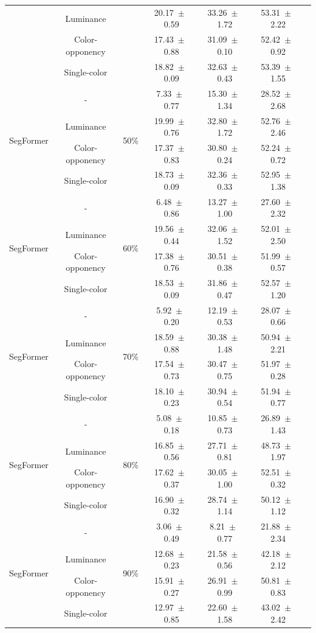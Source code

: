 \begin{table}[h]
\begin{tabular}{@{}lccc ccc@{}}
& Luminance & & 20.17~$\pm$~0.59 & 33.26~$\pm$~1.72 & 53.31~$\pm$~2.22 \\
& Color-opponency & & 17.43~$\pm$~0.88 & 31.09~$\pm$~0.10 & 52.42~$\pm$~0.92 \\
& Single-color & & 18.82~$\pm$~0.09 & 32.63~$\pm$~0.43 & 53.39~$\pm$~1.55 \\
\midrule
\multirow{4}{*}{SegFormer} & - & \multirow{4}{*}{50\%} & 7.33~$\pm$~0.77 & 15.30~$\pm$~1.34 & 28.52~$\pm$~2.68 \\
& Luminance & & 19.99~$\pm$~0.76 & 32.80~$\pm$~1.72 & 52.76~$\pm$~2.46 \\
& Color-opponency & & 17.37~$\pm$~0.83 & 30.80~$\pm$~0.24 & 52.24~$\pm$~0.72 \\
& Single-color & & 18.73~$\pm$~0.09 & 32.36~$\pm$~0.33 & 52.95~$\pm$~1.38 \\
\midrule
\multirow{4}{*}{SegFormer} & - & \multirow{4}{*}{60\%} & 6.48~$\pm$~0.86 & 13.27~$\pm$~1.00 & 27.60~$\pm$~2.32 \\
& Luminance & & 19.56~$\pm$~0.44 & 32.06~$\pm$~1.52 & 52.01~$\pm$~2.50 \\
& Color-opponency & & 17.38~$\pm$~0.76 & 30.51~$\pm$~0.38 & 51.99~$\pm$~0.57 \\
& Single-color & & 18.53~$\pm$~0.09 & 31.86~$\pm$~0.47 & 52.57~$\pm$~1.20 \\
\midrule
\multirow{4}{*}{SegFormer} & - & \multirow{4}{*}{70\%} & 5.92~$\pm$~0.20 & 12.19~$\pm$~0.53 & 28.07~$\pm$~0.66 \\
& Luminance & & 18.59~$\pm$~0.88 & 30.38~$\pm$~1.48 & 50.94~$\pm$~2.21 \\
& Color-opponency & & 17.54~$\pm$~0.73 & 30.47~$\pm$~0.75 & 51.97~$\pm$~0.28 \\
& Single-color & & 18.10~$\pm$~0.23 & 30.94~$\pm$~0.54 & 51.94~$\pm$~0.77 \\
\midrule
\multirow{4}{*}{SegFormer} & - & \multirow{4}{*}{80\%} & 5.08~$\pm$~0.18 & 10.85~$\pm$~0.73 & 26.89~$\pm$~1.43 \\
& Luminance & & 16.85~$\pm$~0.56 & 27.71~$\pm$~0.81 & 48.73~$\pm$~1.97 \\
& Color-opponency & & 17.62~$\pm$~0.37 & 30.05~$\pm$~1.00 & 52.51~$\pm$~0.32 \\
& Single-color & & 16.90~$\pm$~0.32 & 28.74~$\pm$~1.14 & 50.12~$\pm$~1.12 \\
\midrule
\multirow{4}{*}{SegFormer} & - & \multirow{4}{*}{90\%} & 3.06~$\pm$~0.49 & 8.21~$\pm$~0.77 & 21.88~$\pm$~2.34 \\
& Luminance & & 12.68~$\pm$~0.23 & 21.58~$\pm$~0.56 & 42.18~$\pm$~2.12 \\
& Color-opponency & & 15.91~$\pm$~0.27 & 26.91~$\pm$~0.99 & 50.81~$\pm$~0.83 \\
& Single-color & & 12.97~$\pm$~0.85 & 22.60~$\pm$~1.58 & 43.02~$\pm$~2.42 \\
\midrule
\bottomrule
\end{tabular}
\label{tab:sparse_results_segformer_dark_zurich}
\end{table}
